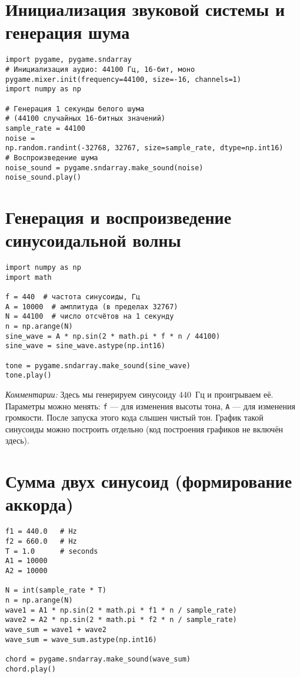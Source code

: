 \documentclass[bachelor, och, diploma]{SCWorks}
\begin{document}
\appendix

\section{Инициализация звуковой системы и генерация шума}
\begin{verbatim}
import pygame, pygame.sndarray
# Инициализация аудио: 44100 Гц, 16-бит, моно
pygame.mixer.init(frequency=44100, size=-16, channels=1)
import numpy as np

# Генерация 1 секунды белого шума 
# (44100 случайных 16-битных значений)
sample_rate = 44100
noise = 
np.random.randint(-32768, 32767, size=sample_rate, dtype=np.int16)
# Воспроизведение шума
noise_sound = pygame.sndarray.make_sound(noise)
noise_sound.play()
\end{verbatim}

\section{Генерация и воспроизведение синусоидальной волны}
\begin{verbatim}
import numpy as np
import math

f = 440  # частота синусоиды, Гц
A = 10000  # амплитуда (в пределах 32767)
N = 44100  # число отсчётов на 1 секунду
n = np.arange(N)
sine_wave = A * np.sin(2 * math.pi * f * n / 44100)
sine_wave = sine_wave.astype(np.int16)

tone = pygame.sndarray.make_sound(sine_wave)
tone.play()
\end{verbatim}

\textit{Комментарии:} Здесь мы генерируем синусоиду 440~Гц и проигрываем её. Параметры можно менять: \texttt{f} — для изменения высоты тона, \texttt{A} — для изменения громкости. После запуска этого кода слышен чистый тон. График такой синусоиды можно построить отдельно (код построения графиков не включён здесь).

\section{Сумма двух синусоид (формирование аккорда)}
\begin{verbatim}
f1 = 440.0   # Hz
f2 = 660.0   # Hz
T = 1.0      # seconds
A1 = 10000
A2 = 10000

N = int(sample_rate * T)
n = np.arange(N)
wave1 = A1 * np.sin(2 * math.pi * f1 * n / sample_rate)
wave2 = A2 * np.sin(2 * math.pi * f2 * n / sample_rate)
wave_sum = wave1 + wave2
wave_sum = wave_sum.astype(np.int16)

chord = pygame.sndarray.make_sound(wave_sum)
chord.play()
\end{verbatim}
\end{document}
